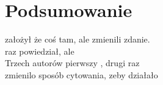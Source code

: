 \clearpage
\chapter{Podsumowanie}
  \parencite{nowakKowalski2010} założył że coś tam, ale \parencite{nowakKowalski2010} zmienili zdanie.\\
  \parencite{nowak2010} raz powiedział, ale \parencite{nowak2010}\\
  Trzech autorów pierwszy \parencite{nowakKowalskiIksinska2010}, drugi raz \parencite{nowakKowalskiIksinska2010}\\
  \parencite{ncn2011} zmienilo sposób cytowania, zeby \parencite{ncn2011} działało\\
  \parencite{www:kotlin}
  